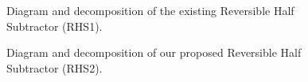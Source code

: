 \documentclass[%
reprint,
 amsmath,amssymb,
 aps,
]{revtex4-1}
\begin{document}
\begin{figure}%

\begin{minipage}{2.1in}%
\end{minipage}%
\hspace{7em}
\parbox{1.2in}{
}%

\caption{Diagram and decomposition of the existing Reversible Half Subtractor (RHS1).}%
\label{fig:proposed RHS1}%
\end{figure}

\begin{figure}%

\begin{minipage}{2.1in}%
\end{minipage}%
\hspace{7em}
\parbox{1.2in}{
}%

\caption{Diagram and decomposition of our proposed Reversible Half Subtractor (RHS2).}%
\label{fig:proposed RHS2}%
\end{figure}
\end{document}
